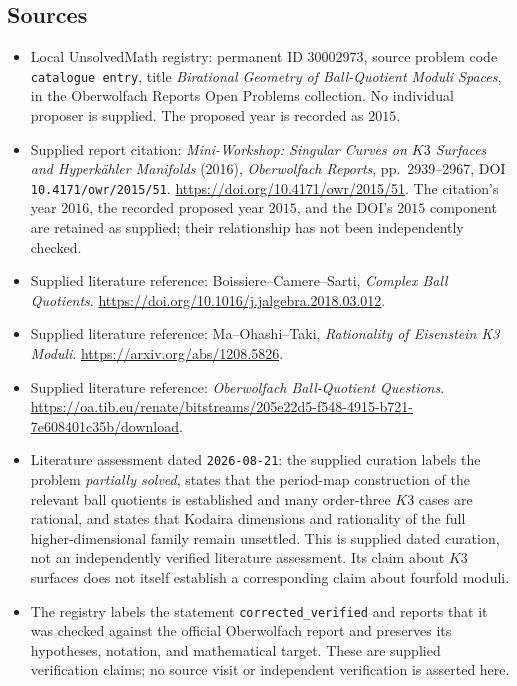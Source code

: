 \documentclass[11pt]{article}
\begin{document}
\subsection{Sources}
\begin{itemize}
\item Local UnsolvedMath registry: permanent ID \(30002973\), source problem code \texttt{catalogue entry}, title \emph{Birational Geometry of Ball-Quotient Moduli Spaces}, in the Oberwolfach Reports Open Problems collection. No individual proposer is supplied. The proposed year is recorded as \(2015\).
\item Supplied report citation: \emph{Mini-Workshop: Singular Curves on \(K3\) Surfaces and Hyperk\"ahler Manifolds} (2016), \emph{Oberwolfach Reports}, pp.~2939--2967, DOI \texttt{10.4171/owr/2015/51}. \url{https://doi.org/10.4171/owr/2015/51}. The citation's year \(2016\), the recorded proposed year \(2015\), and the DOI's \(2015\) component are retained as supplied; their relationship has not been independently checked.
\item Supplied literature reference: Boissiere--Camere--Sarti, \emph{Complex Ball Quotients}. \url{https://doi.org/10.1016/j.jalgebra.2018.03.012}.
\item Supplied literature reference: Ma--Ohashi--Taki, \emph{Rationality of Eisenstein K3 Moduli}. \url{https://arxiv.org/abs/1208.5826}.
\item Supplied literature reference: \emph{Oberwolfach Ball-Quotient Questions}. \url{https://oa.tib.eu/renate/bitstreams/205e22d5-f548-4915-b721-7e608401c35b/download}.
\item Literature assessment dated \texttt{2026-08-21}: the supplied curation labels the problem \emph{partially solved}, states that the period-map construction of the relevant ball quotients is established and many order-three \(K3\) cases are rational, and states that Kodaira dimensions and rationality of the full higher-dimensional family remain unsettled. This is supplied dated curation, not an independently verified literature assessment. Its claim about \(K3\) surfaces does not itself establish a corresponding claim about fourfold moduli.
\item The registry labels the statement \texttt{corrected\_verified} and reports that it was checked against the official Oberwolfach report and preserves its hypotheses, notation, and mathematical target. These are supplied verification claims; no source visit or independent verification is asserted here.
\end{itemize}
\end{document}
